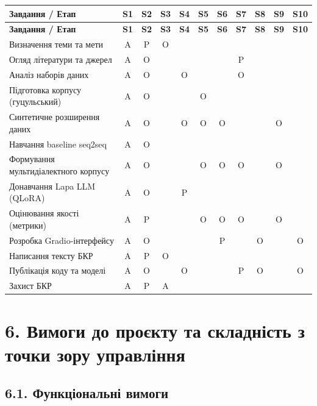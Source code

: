 \documentclass[14pt]{extarticle}
\begin{document}
\begin{center}
\begin{longtable}{|p{}|c|c|c|c|c|c|c|c|c|c|}
\hline
\textbf{Завдання / Етап} & \textbf{S1} & \textbf{S2} & \textbf{S3} & \textbf{S4} & \textbf{S5} & \textbf{S6} & \textbf{S7} & \textbf{S8} & \textbf{S9} & \textbf{S10} \\
\hline
\endfirsthead
\hline
\textbf{Завдання / Етап} & \textbf{S1} & \textbf{S2} & \textbf{S3} & \textbf{S4} & \textbf{S5} & \textbf{S6} & \textbf{S7} & \textbf{S8} & \textbf{S9} & \textbf{S10} \\
\hline
\endhead
Визначення теми та мети & A & P & O & & & & & & & \\
\hline
Огляд літератури та джерел & A & O & & & & & P & & & \\
\hline
Аналіз наборів даних & A & O & & O & & & O & & & \\
\hline
Підготовка корпусу (гуцульський) & A & O & & & O & & & & & \\
\hline
Синтетичне розширення даних & A & O & & O & O & O & & & O & \\
\hline
Навчання baseline seq2seq & A & O & & & & & & & & \\
\hline
Формування мультидіалектного корпусу & A & O & & & O & O & O & & O & \\
\hline
Донавчання Lapa LLM (QLoRA) & A & O & & P & & & & & & \\
\hline
Оцінювання якості (метрики) & A & P & & & O & O & O & & O & \\
\hline
Розробка Gradio-інтерфейсу & A & O & & & & P & & O & & O \\
\hline
Написання тексту БКР & A & P & O & & & & & & & \\
\hline
Публікація коду та моделі & A & O & & O & & & P & O & & O \\
\hline
Захист БКР & A & P & A & & & & & & & \\
\hline
\end{longtable}
\end{center}

\section*{6. Вимоги до проєкту та складність з точки зору управління}

\subsection*{6.1. Функціональні вимоги}
\end{document}
